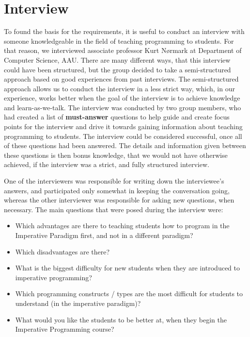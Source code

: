 \section{Interview}
\label{sec:interview}
To found the basis for the requirements, it is useful to conduct an interview with someone knowledgeable in the field of teaching programming to 
students.
For that reason, we interviewed associate professor Kurt N{\o}rmark at Department of Computer Science, AAU.
There are many different ways, that this interview could have been structured, but the group decided to take a semi-structured approach based on good experiences from past interviews.
The semi-structured approach allows us to conduct the interview in a less strict way, which, in our experience, works better when the goal of the interview is to achieve knowledge and learn-as-we-talk.
The interview was conducted by two group members, who had created a list of \textbf{must-answer} questions to help guide and create focus points for the interview and drive it towards gaining information about teaching programming to students.
The interview could be considered successful, once all of these questions had been answered.
The details and information given between these questions is then bonus knowledge, that we would not have otherwise achieved, if the interview was a strict, and fully structured interview.\newline

One of the interviewers was responsible for writing down the interviewee's answers, and participated only somewhat in keeping the conversation going, whereas the other interviewer was responsible for asking new questions, when necessary. 
The main questions that were posed during the interview were:

\begin{itemize}
	\item Which advantages are there to teaching students how to program in the Imperative Paradigm first, and not in a different paradigm?
	\item Which disadvantages are there?
	\item What is the biggest difficulty for new students when they are introduced to imperative programming?
	\item Which programming constructs / types are the most difficult for students to understand (in the imperative paradigm)?
	\item What would you like the students to be better at, when they begin the Imperative Programming course?
\end{itemize}

